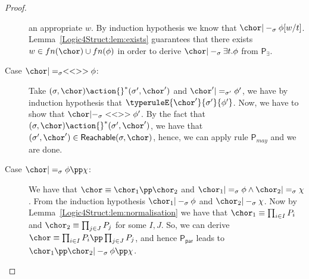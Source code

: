 \begin{proof}
\begin{description}
     an appropriate $w$. By induction hypothesis we know that $\chor
     |-_\sigma \phi[w/t]$. Lemma~\ref{Logic4Struct:lem:exists} guarantees that there
     exists $w \in fn(\chor)\cup fn(\phi)$ in order to derive $\chor
     |-_\sigma \exists t. \phi$ from $\mathsf{P_{\exists}}$.
   \item[Case $\chor |=_\sigma <<>> \phi$:] Take $(\sigma, \chor)
     \action{}^* (\sigma',\chor')$ and $\chor' |=_{\sigma'} \phi'$, we
     have by induction hypothesis that
     $\typeruleE{\chor'}{\sigma'}{\phi'}$. Now, we have to show that
     $\chor |-_\sigma <<>> \phi'$.  By the fact that $(\sigma, \chor)
     \action{}^* (\sigma',\chor')$, we have that $(\sigma', \chor')\in
     \textsf{Reachable}(\sigma,\chor)$, hence, we can apply rule
     $\mathsf{P}_{may}$ and we are done.
   \item[Case $\chor |=_\sigma \phi \pp \chi$:] We have that $\chor
     \equiv \chor_1 \pp \chor_2$ and $\chor_1 |=_\sigma \phi \land
     \chor_2 |=_\sigma \chi$. From the induction hypothesis $\chor_1
     |-_\sigma \phi$ and $\chor_2 |-_\sigma \chi$. Now by
     Lemma~\ref{Logic4Struct:lem:normalisation} we have that $\chor_1 \equiv
     \prod_{i\in I} P_i$ and $\chor_2 \equiv \prod_{j\in J} P_j$ for
     some $I,J$. So, we can derive $\chor \equiv \prod_{i\in I} P_i \pp
     \prod_{j\in J} P_j$, and hence $\mathsf{P_{par}}$ leads to
     $\chor_1 \pp \chor_2 |-_\sigma \phi \pp \chi$. 
   \end{description} 
\end{proof}

